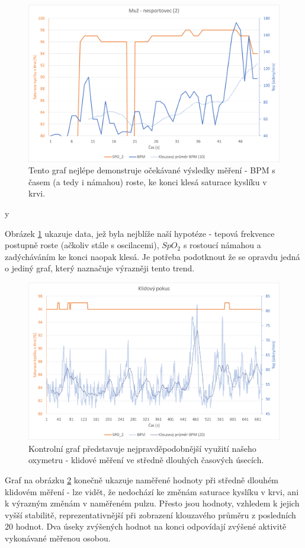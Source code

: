 \begin{figure}[ht]
\centering
  \includegraphics[scale=0.55, center]{Kapitoly/Prakticka/Obrazky/DobryGraf.png}
  \caption [Očekávaný graf muže - nesportovce]{Tento graf nejlépe demonstruje očekávané výsledky měření - BPM s časem (a tedy i námahou) roste, ke konci klesá saturace kyslíku v krvi.}
  \label{fig:Dobry}
\end{figure}y
\par Obrázek \ref{fig:Dobry} ukazuje data, jež byla nejblíže naší hypotéze - tepová frekvence postupně roste (ačkoliv stále s oscilacemi), $SpO_2$ s rostoucí námahou a zadýcháváním ke konci naopak klesá. Je potřeba podotknout že se opravdu jedná o jediný graf, který naznačuje výrazněji tento trend.
\begin{figure}[ht]
\centering
  \includegraphics[scale=0.55, center]{Kapitoly/Prakticka/Obrazky/Kontrola.png}
  \caption [Kontrolní graf v klidu]{Kontrolní graf představuje nejpravděpodobnější využití našeho oxymetru - klidové měření ve středně dlouhých časových úsecích.}
  \label{fig:Control}
\end{figure}
\par Graf na obrázku \ref{fig:Control} konečně ukazuje naměřené hodnoty při středně dlouhém klidovém měření - lze vidět, že nedochází ke změnám saturace kyslíku v krvi, ani k výrazným změnám v naměřeném pulzu. Přesto jsou hodnoty, vzhledem k jejich vyšší stabilitě, reprezentativnější při zobrazení klouzavého průměru z posledních 20 hodnot. Dva úseky zvýšených hodnot na konci odpovídají zvýšené aktivitě vykonávané měřenou osobou.
